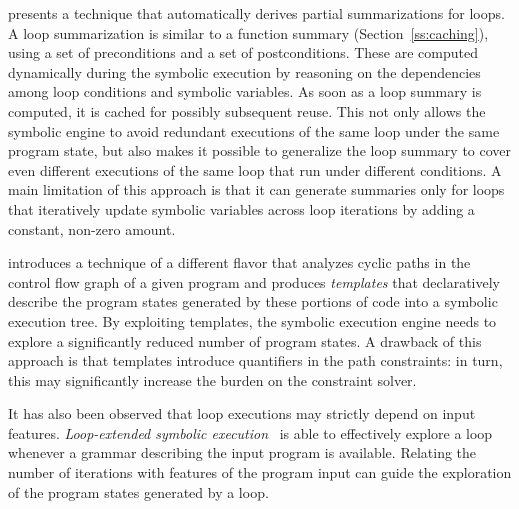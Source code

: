 \cite{GL-ISSTA11} presents a technique that automatically derives partial summarizations for loops. A loop summarization is similar to a function summary (Section~\ref{ss:caching}), using a set of preconditions and a set of postconditions. These are computed dynamically during the symbolic execution by reasoning on the dependencies among loop conditions and symbolic variables. As soon as a loop summary is computed, it is cached for possibly subsequent reuse. This not only allows the symbolic engine to avoid redundant executions of the same loop under the same program state, but also makes it possible to generalize the loop summary to cover even different executions of the same loop that run under different conditions. A main limitation of this approach is that it can generate summaries only for loops that iteratively update symbolic variables across loop iterations by adding a constant, non-zero amount.

\cite{SST-ATVA13} introduces a technique of a different flavor that analyzes cyclic paths in the control flow graph of a given program and produces {\em templates} that declaratively describe the program states generated by these portions of code into a symbolic execution tree. By exploiting templates, the symbolic execution engine needs to explore a significantly reduced number of program states. A drawback of this approach is that templates introduce quantifiers in the path constraints: in turn, this may significantly increase the burden on the constraint solver.

It has also been observed that loop executions may strictly depend on input features. {\em Loop-extended symbolic execution}~\cite{SPM-ISSTA09} is able to effectively explore a loop whenever a grammar describing the input program is available. Relating the number of iterations with features of the program input can guide the exploration of the program states generated by a loop.


